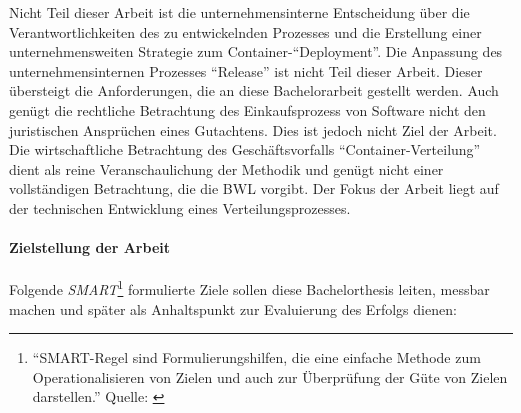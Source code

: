\par
Nicht Teil dieser Arbeit ist die unternehmensinterne Entscheidung über die Verantwortlichkeiten des zu entwickelnden Prozesses und die Erstellung einer unternehmensweiten Strategie zum Container-\enquote{Deployment}. Die Anpassung des unternehmensinternen Prozesses \enquote{Release} ist nicht Teil dieser Arbeit. Dieser übersteigt die Anforderungen, die an diese Bachelorarbeit gestellt werden. Auch genügt die rechtliche Betrachtung des Einkaufsprozess von Software nicht den juristischen Ansprüchen eines Gutachtens. Dies ist jedoch nicht Ziel der Arbeit. Die wirtschaftliche Betrachtung des Geschäftsvorfalls  \enquote{Container-Verteilung} dient als reine Veranschaulichung der Methodik und genügt nicht einer vollständigen Betrachtung, die die \ac{BWL} vorgibt. Der Fokus der Arbeit liegt auf der technischen Entwicklung eines Verteilungsprozesses.

\paragraph{Zielstellung der Arbeit}\label{kap:einleitung:Ziele}
Folgende \textit{SMART}\footnote{\enquote{SMART-Regel sind Formulierungshilfen, die eine einfache Methode zum Operationalisieren von Zielen und auch zur Überprüfung der Güte von Zielen darstellen.} Quelle: \cite[][S.69]{dechange_projektmanagement_2020}} formulierte Ziele sollen diese Bachelorthesis leiten, messbar machen und später als Anhaltspunkt zur Evaluierung des Erfolgs dienen:

